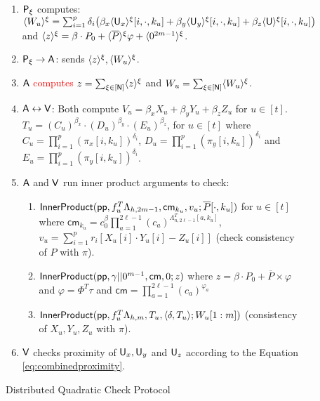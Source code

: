 \begin{figure}[h]
{\begin{framed}
\begin{enumerate}[{\rm 1.}]
				\item $\mathsf{P}_\xi$ computes:
				$\langle{W_u}\rangle^\xi=\sum_{i=1}^p\delta_i\big(\beta_x\langle{\mathsf{U}_x}\rangle^\xi[i,\cdot,k_u]+\beta_y\langle{\mathsf{U}_y}\rangle^\xi[i,\cdot,k_u]+\beta_z\langle{\mathsf{U}}\rangle^\xi[i,\cdot,k_u]\big)$ and $\langle{z}\rangle^\xi =  \beta\cdot P_0 + \langle{\overline{P}}\rangle^\xi\varphi + \langle{0^{2m-1}}\rangle^\xi$.
				\item $\mathsf{P}_\xi\rightarrow\mathsf{A}$:  sends $\langle{z}\rangle^\xi, \langle{W_u}\rangle^\xi$.
				\item \textcolor{red}{$\mathsf{A}$ computes $z=\sum_{\xi\in[\mathsf{N}]} \langle{z}\rangle^\xi$} and $W_u = \sum_{\xi\in[\mathsf{N}]} \langle{W_u}\rangle^\xi$.
				\item $\mathsf{A} \leftrightarrow \mathsf{V}$: Both compute $V_u = \beta_x X_u + \beta_y Y_u + \beta_z Z_u$ for $u\in[t]$. $T_u = (C_u)^{\beta_x}\cdot(D_u)^{\beta_y}\cdot(E_u)^{\beta_z}$, for $u\in [t]$ where
				$C_u=\prod_{i=1}^{p}(\pi_x[i,k_u])^{\delta_i}$, $D_u=\prod_{i=1}^{p}(\pi_y[i,k_u])^{\delta_i}$
				and $E_u=\prod_{i=1}^{p}(\pi_y[i,k_u])^{\delta_i}$.
				\item $\mathsf{A}$ and $\mathsf{V}$ run inner product arguments to check:
				\begin{enumerate}
					\item $\mathsf{InnerProduct}(\mathsf{pp},f_u^T\Lambda_{h,2m-1},\mathsf{cm}_{k_u},v_u;\overline{P}[\cdot,k_u])$ for $u\in [t]$ where $\mathsf{cm}_{k_u}=c_0^{\beta}\prod_{a=1}^{2\ell-1}(c_a)^{\Lambda_{n,2\ell-1}^T[a,k_u]}$, 
					$v_u=\sum_{i=1}^p r_i[X_u[i]\cdot Y_u[i] - Z_u[i]]$ (check consistency of $P$ with $\pi$).
					\item $\mathsf{InnerProduct}(\mathsf{pp},\gamma||0^{m-1},\mathsf{cm},0;z)$ where $z=\beta\cdot P_0 + \overline{P}\times \varphi$ and $\varphi = \Phi^T\tau$ and $\mathsf{cm} = \prod_{a=1}^{2\ell-1} (c_a)^{\varphi_a}$ %
					\item
					$\mathsf{InnerProduct}(\mathsf{pp},f_u^T\Lambda_{h,m},T_u,\langle \delta,T_u\rangle;W_u[1:m])$ (consistency of $X_u, Y_u, Z_u$ with $\pi$).
				\end{enumerate}
				\item $\mathsf{V}$ checks proximity of $\mathsf{U}_x,\mathsf{U}_y$ and $\mathsf{U}_z$ according to the Equation \eqref{eq:combinedproximity}.
			\end{enumerate}
		\end{framed}
		\caption{Distributed Quadratic Check Protocol}
		\label{fig:distquadcheck}
	}
\end{figure}

\appendix
